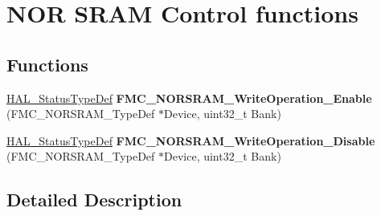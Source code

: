 \hypertarget{group___f_m_c___l_l___n_o_r_s_r_a_m___private___functions___group2}{}\section{N\+OR S\+R\+AM Control functions}
\label{group___f_m_c___l_l___n_o_r_s_r_a_m___private___functions___group2}
\subsection*{Functions}
\begin{DoxyCompactItemize}
\item 
\hyperlink{stm32f4xx__hal__def_8h_a63c0679d1cb8b8c684fbb0632743478f}{H\+A\+L\+\_\+\+Status\+Type\+Def} {\bfseries F\+M\+C\+\_\+\+N\+O\+R\+S\+R\+A\+M\+\_\+\+Write\+Operation\+\_\+\+Enable} (F\+M\+C\+\_\+\+N\+O\+R\+S\+R\+A\+M\+\_\+\+Type\+Def $\ast$Device, uint32\+\_\+t Bank)\hypertarget{group___f_m_c___l_l___n_o_r_s_r_a_m___private___functions___group2_gaf65abd6e124e49bf83af3c80b27ad332}{}\label{group___f_m_c___l_l___n_o_r_s_r_a_m___private___functions___group2_gaf65abd6e124e49bf83af3c80b27ad332}

\item 
\hyperlink{stm32f4xx__hal__def_8h_a63c0679d1cb8b8c684fbb0632743478f}{H\+A\+L\+\_\+\+Status\+Type\+Def} {\bfseries F\+M\+C\+\_\+\+N\+O\+R\+S\+R\+A\+M\+\_\+\+Write\+Operation\+\_\+\+Disable} (F\+M\+C\+\_\+\+N\+O\+R\+S\+R\+A\+M\+\_\+\+Type\+Def $\ast$Device, uint32\+\_\+t Bank)\hypertarget{group___f_m_c___l_l___n_o_r_s_r_a_m___private___functions___group2_ga5db03521d17c15b98685cc34540d638d}{}\label{group___f_m_c___l_l___n_o_r_s_r_a_m___private___functions___group2_ga5db03521d17c15b98685cc34540d638d}

\end{DoxyCompactItemize}


\subsection{Detailed Description}
